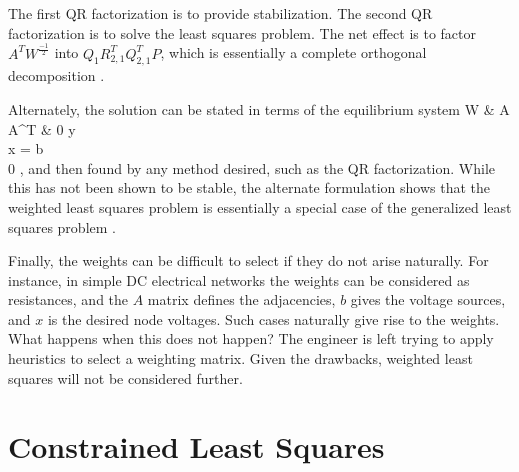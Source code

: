 The first QR factorization is to provide stabilization.  The second QR factorization is to solve the least squares problem.  The net effect is to factor $A^{T}W^{\frac{-1}{2}}$ into $Q_{1}R_{2,1}^{T}Q_{2,1}^{T}P$, which is essentially a complete orthogonal decomposition .

Alternately, the solution can be stated in terms of the equilibrium system
\beqn
\bmat W     & A \\
              A^{T} & 0 \emat
\bmat y \\
              x \emat
=
\bmat b \\
              0 \emat,
\eeqn
and then found by any method desired, such as the QR factorization.  While this has not been shown to be stable, the alternate formulation shows that the weighted least squares problem is essentially a special case of the generalized least squares problem .

Finally, the weights can be difficult to select if they do not arise naturally.  For instance, in simple DC electrical networks the weights can be considered as resistances, and the $A$ matrix defines the adjacencies, $b$ gives the voltage sources, and $x$ is the desired node voltages.  Such cases naturally give rise to the weights.  What happens when this does not happen?  The engineer is left trying to apply heuristics to select a weighting matrix.  Given the drawbacks, weighted least squares will not be considered further.

\section{Constrained Least Squares}\label{s-cls}

